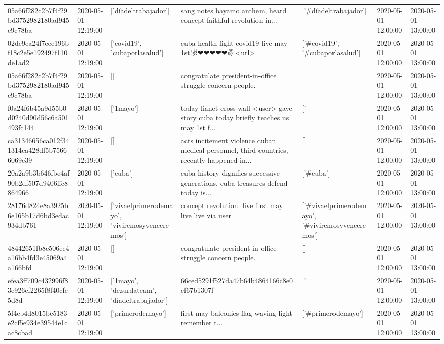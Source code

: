 \begin{tabular}{lllllll}
05a66f282c2b7f4f29bd3752982180ad945c9c78ba & 2020-05-01 12:19:00 & ['díadeltrabajador'] & sang notes bayamo anthem, heard concept faithful revolution in... & ['#díadeltrabajador'] & 2020-05-01 12:00:00 & 2020-05-01 13:00:00 \\
02de9ea24f7eee196bf18c2e5e192497f110de1ad2 & 2020-05-01 12:19:00 & ['covid19', 'cubaporlasalud'] & cuba health fight covid19 live may 1st!✌❤❤❤❤❤✌ <url> & ['#covid19', '#cubaporlasalud'] & 2020-05-01 12:00:00 & 2020-05-01 13:00:00 \\
05a66f282c2b7f4f29bd3752982180ad945c9c78ba & 2020-05-01 12:19:00 & [] & congratulate president-in-office struggle concern people. & [] & 2020-05-01 12:00:00 & 2020-05-01 13:00:00 \\
f0a24f6b45a9d55b0d0240d90d56c6a501493fc144 & 2020-05-01 12:19:00 & ['1mayo'] & today lianet cross wall <user> gave story cuba today briefly teaches us may 1st f... & ['#1mayo'] & 2020-05-01 12:00:00 & 2020-05-01 13:00:00 \\
ca31346656ca012f341314ca428df5b75666069e39 & 2020-05-01 12:19:00 & [] & acts incitement violence cuban medical personnel, third countries, recently happened in... & [] & 2020-05-01 12:00:00 & 2020-05-01 13:00:00 \\
20a2a9b3b646fbe4af90b2df507d9406ffc8864966 & 2020-05-01 12:19:00 & ['cuba'] & cuba history dignifies successive generations, cuba treasures defend today is... & ['#cuba'] & 2020-05-01 12:00:00 & 2020-05-01 13:00:00 \\
28176d824e8a3925b6e165b17d6bd3edac934db761 & 2020-05-01 12:19:00 & ['vivaelprimerodemayo', 'viviremosyvenceremos'] & concept revolution. live first may live live via user & ['#vivaelprimerodemayo', '#viviremosyvenceremos'] & 2020-05-01 12:00:00 & 2020-05-01 13:00:00 \\
48442651fb8c506ee4a16bb4fd3e45069a4a166bfd & 2020-05-01 12:19:00 & [] & congratulate president-in-office struggle concern people. & [] & 2020-05-01 12:00:00 & 2020-05-01 13:00:00 \\
efea3ff709c432996f83e926cf2265f8f40cfe5d8d & 2020-05-01 12:19:00 & ['1mayo', 'dezurdateam', 'díadeltrabajador'] & 66ced5291f527da47b64b4864166c8e0cf67b1307f & ['#1mayo', '#dezurdateam', '#díadeltrabajador'] & 2020-05-01 12:00:00 & 2020-05-01 13:00:00 \\
5f4cb4d8015be5183e2cf5e934e39544e1cac8cbad & 2020-05-01 12:19:00 & ['primerodemayo'] & first may balconies flag waving light remember t... & ['#primerodemayo'] & 2020-05-01 12:00:00 & 2020-05-01 13:00:00 \\

\end{tabular}
